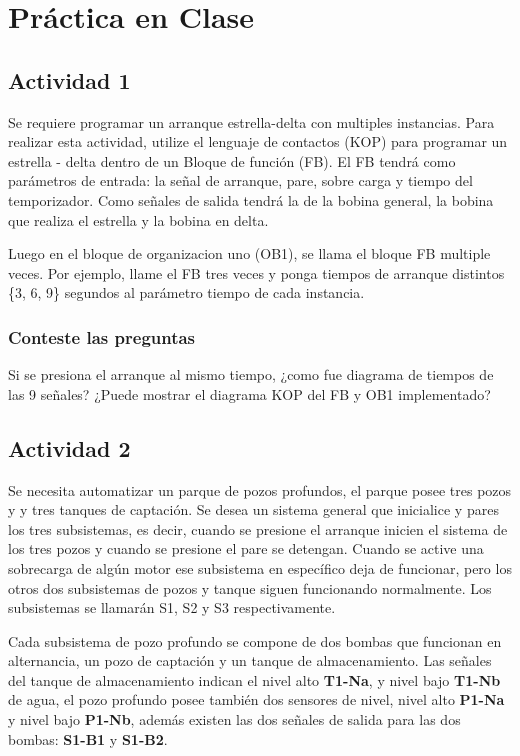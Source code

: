 \section{Práctica en Clase}

\subsection{Actividad 1}

	Se requiere programar un arranque estrella-delta con multiples instancias. Para realizar esta actividad, utilize el lenguaje de contactos (KOP) para programar un  estrella - delta  dentro de un Bloque de función (FB). El FB tendrá como parámetros de entrada: la señal de arranque, pare, sobre carga y tiempo del temporizador. Como señales de salida tendrá la de la bobina general, la bobina que realiza el estrella y la bobina en delta.
	
	Luego en el bloque de organizacion uno (OB1), se llama el bloque  FB multiple veces. Por ejemplo, llame el FB tres veces y ponga tiempos de arranque distintos \{3, 6, 9\} segundos al parámetro tiempo  de  cada instancia.
	
 \subsubsection{Conteste las preguntas}
  
  Si se presiona el arranque al mismo tiempo, ¿como fue diagrama de tiempos de las 9 señales?
  ¿Puede mostrar el diagrama KOP del FB y OB1 implementado?
  

\subsection{Actividad 2}

Se necesita automatizar un parque de pozos profundos, el parque posee tres pozos y y tres tanques de captación. Se desea un sistema general que inicialice y pares los tres subsistemas, es decir, cuando se presione el arranque inicien el sistema de los tres pozos y cuando se presione el pare se detengan. Cuando se active una sobrecarga de algún motor ese subsistema en específico deja de funcionar, pero los otros dos subsistemas de pozos y tanque siguen funcionando normalmente. Los subsistemas se llamarán S1, S2 y S3 respectivamente.

Cada subsistema de pozo profundo se compone de dos bombas que funcionan en alternancia, un pozo de captación y un tanque de almacenamiento. Las señales del tanque de almacenamiento indican el nivel alto \textbf{T1-Na}, y nivel bajo \textbf{T1-Nb} de agua, el pozo profundo posee también dos sensores de nivel, nivel alto \textbf{P1-Na} y nivel bajo \textbf{P1-Nb}, además existen las dos señales de salida para las dos bombas: \textbf{S1-B1} y \textbf{S1-B2}. 

